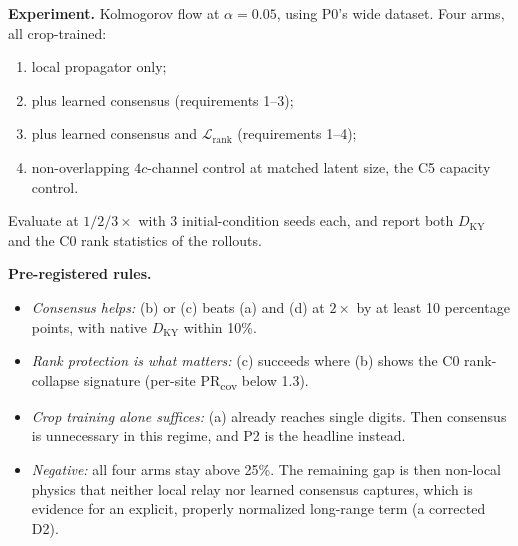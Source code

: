 \documentclass[11pt]{article}
\begin{document}
\textbf{Experiment.} Kolmogorov flow at $\alpha{=}0.05$, using P0's wide
dataset. Four arms, all crop-trained:
\begin{enumerate}[label=(\alph*),leftmargin=*]
\item local propagator only;
\item plus learned consensus (requirements 1--3);
\item plus learned consensus and $\mathcal L_{\mathrm{rank}}$
  (requirements 1--4);
\item non-overlapping $4c$-channel control at matched latent size, the C5
  capacity control.
\end{enumerate}
Evaluate at $1/2/3\times$ with 3 initial-condition seeds each, and report
both $D_{\mathrm{KY}}$ and the C0 rank statistics of the rollouts.

\textbf{Pre-registered rules.}
\begin{itemize}[leftmargin=*]
\item \emph{Consensus helps:} (b) or (c) beats (a) and (d) at $2\times$ by
  at least 10 percentage points, with native $D_{\mathrm{KY}}$ within
  10\%.
\item \emph{Rank protection is what matters:} (c) succeeds where (b)
  shows the C0 rank-collapse signature (per-site PR\textsubscript{cov}
  below 1.3).
\item \emph{Crop training alone suffices:} (a) already reaches single
  digits. Then consensus is unnecessary in this regime, and P2 is the
  headline instead.
\item \emph{Negative:} all four arms stay above 25\%. The remaining gap
  is then non-local physics that neither local relay nor learned
  consensus captures, which is evidence for an explicit, properly
  normalized long-range term (a corrected D2).
\end{itemize}
\end{document}
